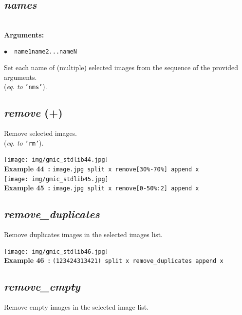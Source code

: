 \documentclass[a4paper,10.5pt,twoside]{book}
\def\comma{\discretionary{,}{}{,}}
\newcommand{\Cb}[1]{\textcolor{cb}{#1}}
\begin{document}
\subsection{\emph{names} }\vspace*{-0.7em}
~\\\textbf{\Cb{Arguments: }}\begin{flushleft}
{\small \Cb{\hspace*{0.5cm}$\bullet$~~\texttt{name1{\comma}name2{\comma}...{\comma}nameN}}}\end{flushleft}
Set each name of (multiple) selected images from the sequence of the provided arguments.
~\\(\emph{eq. to} {\small \texttt{'nms'}}).


\subsection{\emph{remove} (+)}\vspace*{-0.7em}
Remove selected images.
~\\(\emph{eq. to} {\small \texttt{'rm'}}).
\begin{center}\texttt{[image: img/gmic\_stdlib44.jpg]}\\
{\footnotesize \textbf{Example 44~:} \texttt{image.jpg split x remove[30\%-70\%] append x}}
\\\texttt{[image: img/gmic\_stdlib45.jpg]}\\
{\footnotesize \textbf{Example 45~:} \texttt{image.jpg split x remove[0-50\%:2] append x}}
\end{center}

\subsection{\emph{remove\_duplicates} }\vspace*{-0.7em}
Remove duplicates images in the selected images list.
\begin{center}\texttt{[image: img/gmic\_stdlib46.jpg]}\\
{\footnotesize \textbf{Example 46~:} \texttt{(1{\comma}2{\comma}3{\comma}4{\comma}2{\comma}4{\comma}3{\comma}1{\comma}3{\comma}4{\comma}2{\comma}1) split x remove\_duplicates append x}}
\end{center}

\subsection{\emph{remove\_empty} }\vspace*{-0.7em}
Remove empty images in the selected image list.
\end{document}
